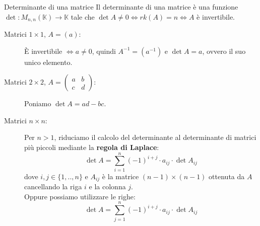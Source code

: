 \documentclass[a4paper]{article}
\theoremstyle{definition}
\begin{document}
\begin{deff}{Determinante di una matrice}{}
	Il determinante di una matrice è una funzione $\det: M_{n,n}(\mathbb{K}) \rightarrow \mathbb{K}$ tale che $\det A \ne 0 \Leftrightarrow rk(A) = n \Leftrightarrow A$ è invertibile.
	\begin{description}
		\item[Matrici $1 \times 1$, $A = (a)$:]
			È invertibile $\Leftrightarrow a \ne 0$, quindi $A^{-1} = (a^{-1})$ e \underline{$\det A = a$}, ovvero il suo unico elemento.
		\item[Matrici $2 \times 2$, $A = \begin{pmatrix}
			a & b \\
			c & d
		\end{pmatrix}$:] Poniamo \underline{$\det A = ad - bc$}.
		      
		\item[Matrici $n \times n$:] Per $n > 1$, riduciamo il calcolo del determinante al determinante di matrici più piccoli mediante la \textbf{regola di Laplace}:
		      \begin{equation*}
			      \det A = \sum_{i = 1}^{n} (-1)^{i + j} \cdot a_{ij} \cdot \det A_{ij}
		      \end{equation*}
		      dove $i, j \in \{1, .., n\}$ e $A_{ij}$ è la matrice $(n - 1) \times (n - 1)$ ottenuta da $A$ cancellando la riga $i$ e la colonna $j$. \\
			  Oppure possiamo utilizzare le righe:
			  \begin{equation*}
				  \det A = \sum_{j = 1}^{n} (-1)^{i + j} \cdot a_{ij} \cdot \det A_{ij}
				\end{equation*}
	\end{description}
\end{deff}
\end{document}
